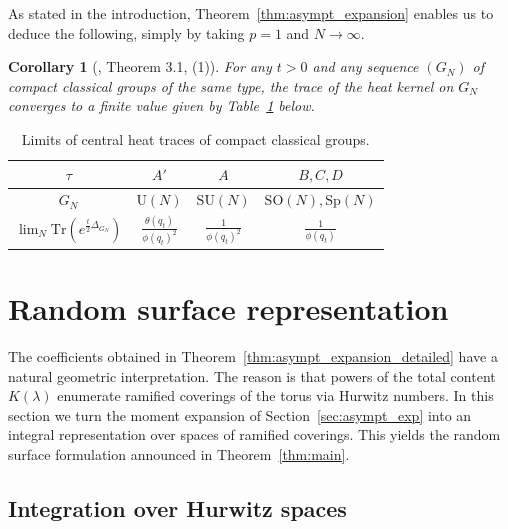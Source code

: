 \documentclass[11pt,a4paper,reqno]{article}
\newtheorem{corollary}[theorem]{Corollary}
\theoremstyle{definition}
\theoremstyle{remark}
\newcommand\SU{{\mathrm{SU}}}
\newcommand\SO{{\mathrm{SO}}}
\newcommand\Sp{{\mathrm{Sp}}}
\newcommand\U{{\mathrm U}}
\newcommand\Tr{\mathrm{Tr}}
\begin{document}
As stated in the introduction, Theorem~\ref{thm:asympt_expansion} enables us to deduce the following, simply by taking $p=1$ and $N\to\infty$.

\begin{corollary}[\cite{DL}, Theorem 3.1, (1)]\label{cor:lim_pf}
For any $t>0$ and any sequence $(G_N)$ of compact classical groups of the same type, the trace of the heat kernel on $G_N$ converges to a finite value given by Table~\ref{tab:limits} below.
\end{corollary}

\begin{table}[h!]
    \centering
    \begin{tabular}{|c|c|c|c|}
    \hline $\tau$ & $A'$ & $A$ & $B, C, D$\\
     \hline $G_N$ & $\U(N)$ & $\SU(N)$ & $\SO(N), \Sp(N)$ \\
\hline $\lim_N \Tr(e^{\frac{t}{2}\Delta_{G_N}})$ & $\frac{\theta(q_t)}{\phi(q_t)^2}$ & $\frac{1}{\phi(q_t)^2}$ & $\frac{1}{\phi(q_t)}$ \\
\hline
    \end{tabular}
    \caption{Limits of central heat traces of compact classical groups.}
    \label{tab:limits}
\end{table}

\section{Random surface representation}

The coefficients obtained in Theorem~\ref{thm:asympt_expansion_detailed} have a natural geometric interpretation. The reason is that powers of the total content $K(\lambda)$ enumerate ramified coverings of the torus via Hurwitz numbers. In this section we turn the moment expansion of Section~\ref{sec:asympt_exp} into an integral representation over spaces of ramified coverings. This yields the random surface formulation announced in Theorem~\ref{thm:main}.

\subsection{Integration over Hurwitz spaces}\label{sec:Hurwitz_integration}
\end{document}
